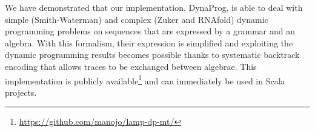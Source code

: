 We have demonstrated that our implementation, DynaProg, is able to deal with simple (Smith-Waterman) and complex (Zuker and RNAfold) dynamic programming problems on sequences that are expressed by a grammar and an algebra. With this formalism, their expression is simplified and exploiting the dynamic programming results becomes possible thanks to systematic backtrack encoding that allows traces to be exchanged between algebrae. This implementation is publicly available\footnote{\url{https://github.com/manojo/lamp-dp-mt/}} and can immediately be used in Scala projects.

%
